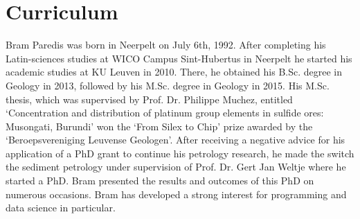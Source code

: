 \chapter{Curriculum}\label{ch:curriculum}

Bram Paredis was born in Neerpelt on July 6th, 1992. %
After completing his Latin-sciences studies at WICO Campus Sint-Hubertus in Neerpelt he started his academic studies at KU Leuven in 2010. %
There, he obtained his B.Sc. degree in Geology in 2013, followed by his M.Sc. degree in Geology in 2015. %
His M.Sc. thesis, which was supervised by Prof. Dr. Philippe Muchez, entitled `Concentration and distribution of platinum group elements in sulfide ores: Musongati, Burundi' won the `From Silex to Chip' prize awarded by the `Beroepsvereniging Leuvense Geologen'. %
After receiving a negative advice for his application of a PhD grant to continue his petrology research, he made the switch the sediment petrology under supervision of Prof. Dr. Gert Jan Weltje where he started a PhD. %
Bram presented the results and outcomes of this PhD on numerous occasions. %
Bram has developed a strong interest for programming and data science in particular. %


\instructionscv


\cleardoublepage

